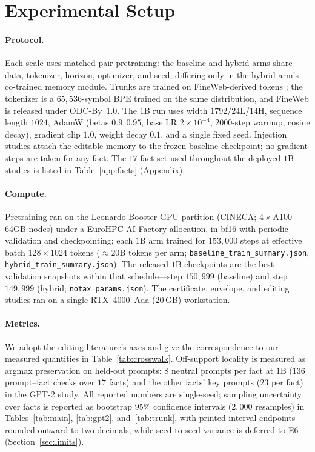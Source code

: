 \documentclass[11pt]{article}
\theoremstyle{remark}
\begin{document}
\section{Experimental Setup}
\label{sec:setup}

\paragraph{Protocol.} Each scale uses matched-pair pretraining: the baseline and
hybrid arms share data, tokenizer, horizon, optimizer, and seed, differing only in
the hybrid arm's co-trained memory module. Trunks are trained on FineWeb-derived
tokens \citep{penedo2024fineweb}; the tokenizer is a $65{,}536$-symbol BPE
trained on the same distribution, and FineWeb is released under ODC-By~1.0. The
$1$B run uses width $1792$/$24$L/$14$H,
sequence length $1024$, AdamW (betas $0.9,0.95$, base LR $2\!\times\!10^{-4}$,
$2000$-step warmup, cosine decay), gradient clip $1.0$, weight decay $0.1$, and a
single fixed seed. Injection studies attach the editable memory to the frozen
baseline checkpoint; no gradient steps are taken for any fact. The $17$-fact
set used throughout the deployed $1$B studies is listed in
Table~\ref{app:facts} (Appendix).

\paragraph{Compute.} Pretraining ran on the Leonardo Booster GPU partition
(CINECA; $4\times$A100-64GB nodes) under a EuroHPC AI Factory allocation, in
bf16 with periodic validation
and checkpointing; each $1$B arm trained for $153{,}000$ steps at effective
batch $128\times1024$ tokens ($\approx20$B
tokens per arm; \texttt{baseline\_train\_summary.json},
\texttt{hybrid\_train\_summary.json}). The released $1$B checkpoints are the
best-validation snapshots within that schedule---step $150{,}999$ (baseline) and
step $149{,}999$ (hybrid; \texttt{notax\_params.json}). The certificate,
envelope, and editing studies ran on a single RTX~4000~Ada (20\,GB)
workstation.

\paragraph{Metrics.} We adopt the editing literature's axes and give the
correspondence to our measured quantities in Table~\ref{tab:crosswalk}.
Off-support locality is measured as argmax preservation on held-out prompts:
$8$ neutral prompts per fact at $1$B ($136$ prompt--fact checks over $17$ facts)
and the other facts' key prompts ($23$ per fact) in the GPT-2 study. All
reported numbers are single-seed; sampling uncertainty over facts is reported as
bootstrap $95\%$ confidence intervals ($2{,}000$ resamples) in
Tables~\ref{tab:main}, \ref{tab:gpt2}, and~\ref{tab:trunk}, with printed
interval endpoints rounded outward to two decimals, while seed-to-seed
variance is deferred to E6 (Section~\ref{sec:limits}).
\end{document}
